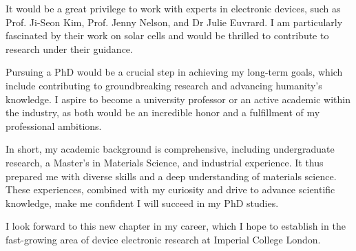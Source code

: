 \documentclass[12pt]{article}
\begin{document}
It would be a great privilege to work with experts in electronic devices, such as Prof. Ji-Seon Kim, Prof. Jenny Nelson, and Dr Julie Euvrard. I am particularly fascinated by their work on solar cells and would be thrilled to contribute to research under their guidance.

Pursuing a PhD would be a crucial step in achieving my long-term goals, which include contributing to groundbreaking research and advancing humanity's knowledge. I aspire to become a university professor or an active academic within the industry, as both would be an incredible honor and a fulfillment of my professional ambitions.

In short, my academic background is comprehensive, including undergraduate research, a Master's in Materials Science, and industrial experience. It thus prepared me with diverse skills and a deep understanding of materials science. These experiences, combined with my curiosity and drive to advance scientific knowledge, make me confident I will succeed in my PhD studies.

I look forward to this new chapter in my career, which I hope to establish in the fast-growing area of device electronic research at Imperial College London.
\vspace{0.125in}


\end{document}
